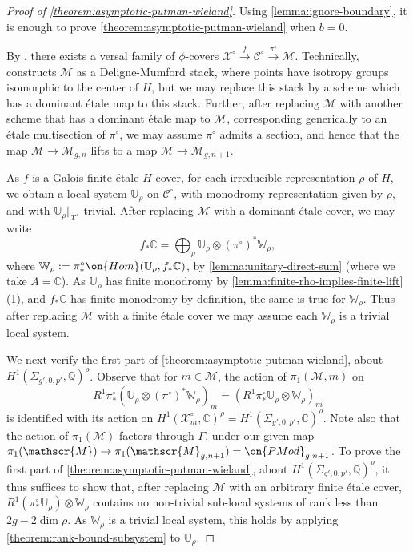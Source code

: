 \begin{proof}[Proof of \autoref{theorem:asymptotic-putman-wieland}]
	Using \autoref{lemma:ignore-boundary},
	it is enough to prove
	\autoref{theorem:asymptotic-putman-wieland}
	when $b =0$.

	By \cite[Theorem 4]{wewers:thesis}, there exists a versal family of
	$\phi$-covers $\mathscr X^\circ \xrightarrow{f} \mathscr C^\circ
	\xrightarrow{\pi^\circ} \mathscr M$.
	Technically,
	\cite[Theorem 4]{wewers:thesis} constructs $\mathscr M$ as a Deligne-Mumford stack,
	where points have isotropy groups isomorphic to the center of $H$,
	but we may replace this stack by
	a scheme which has a dominant \'etale map to this stack.
	Further, after replacing $\mathscr M$ with another scheme that has a dominant \'etale map
	to $\mathscr M$, corresponding generically to an \'etale multisection of $\pi^\circ$, we may assume $\pi^\circ$ admits a section, and hence that the map $\mathscr{M}\to \mathscr{M}_{g,n}$ lifts to a map $\mathscr{M}\to \mathscr{M}_{g,n+1}$.

	As $f$ is a Galois finite \'etale $H$-cover, for each irreducible
	representation $\rho$ of $H$, we obtain a local system $\mathbb{U}_\rho$
	on $\mathscr{C}^\circ$, with monodromy representation given by $\rho$,
	and with $\mathbb{U}_\rho|_{\mathscr{X}^\circ}$ trivial. After replacing $\mathscr{M}$ with a dominant \'etale cover, we may write
	$$f_*\mathbb{C}=\bigoplus_\rho \mathbb{U}_\rho\otimes
	(\pi^\circ)^*\mathbb{W}_\rho,$$ where
	$\mathbb{W}_\rho:=\pi^\circ_*\on{Hom}(\mathbb{U}_\rho, f_*\mathbb{C})$,
	by \autoref{lemma:unitary-direct-sum} (where we take $A=\mathbb{C}$).
	As
	$\mathbb{U}_\rho$ has finite monodromy by
	\autoref{lemma:finite-rho-implies-finite-lift}(1), and $f_*\mathbb{C}$
	has finite monodromy by definition, the same is true for
	$\mathbb{W}_\rho$. Thus after replacing $\mathscr{M}$ with a finite \'etale cover we may assume each
	$\mathbb{W}_\rho$ is a trivial local system.

	We next verify the first part of
	\autoref{theorem:asymptotic-putman-wieland}, about $H^1(\Sigma_{g', 0,
	p'}, \mathbb{Q})^\rho$.
	Observe that for $m\in \mathscr{M}$, the action of $\pi_1(\mathscr{M},
	m)$ on $$R^1\pi^\circ_*( \mathbb{U}_\rho\otimes
	(\pi^\circ)^*\mathbb{W}_\rho)_m=(R^1\pi^\circ_* \mathbb{U}_\rho\otimes
	\mathbb{W}_\rho)_m$$ is identified with its action on
	$H^1(\mathscr{X}^\circ_m, \mathbb{C})^\rho=H^1(\Sigma_{g', 0, p'},
	\mathbb{C})^\rho$.
	Note also that the action of
	$\pi_1(\mathscr{M})$ factors through $\Gamma$,
	under our given map $\pi_1(\mathscr{M})\to \pi_1(\mathscr{M}_{g,n+1})=\on{PMod}_{g,n+1}$.
	To prove the first part of
	\autoref{theorem:asymptotic-putman-wieland}, about $H^1(\Sigma_{g', 0,
	p'}, \mathbb{Q})^\rho$, it thus suffices to show that, after replacing
	$\mathscr{M}$ with an arbitrary finite \'etale cover, $R^1(\pi^\circ_*
	\mathbb{U}_\rho)\otimes \mathbb{W}_\rho$ contains no non-trivial
	sub-local systems of rank less than $2g-2\dim\rho$.
	As $\mathbb{W}_\rho$
	is a trivial local system, this holds by applying
	\autoref{theorem:rank-bound-subsystem} to $\mathbb{U}_\rho$.


\end{proof}
